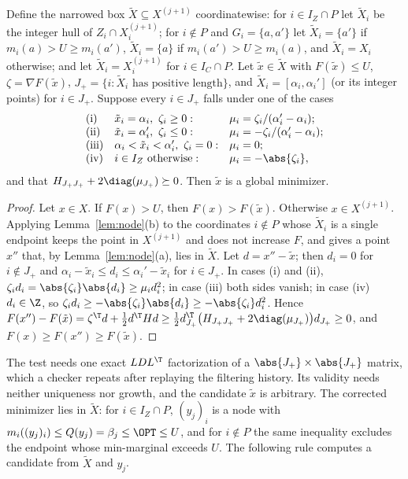 \begin{proposition}\label{prop:local}
Define the narrowed box $\tilde X\subseteq X^{(j+1)}$ coordinatewise: for
$i\in I_Z\cap P$ let $\tilde X_i$ be the integer hull of
$Z_i\cap X^{(j+1)}_i$; for $i\notin P$ and $G_i=\{a,a'\}$ let
$\tilde X_i=\{a'\}$ if $m_i(a)>U\ge m_i(a')$, $\tilde X_i=\{a\}$ if
$m_i(a')>U\ge m_i(a)$, and $\tilde X_i=X_i$ otherwise; and let
$\tilde X_i=X^{(j+1)}_i$ for $i\in I_C\cap P$. Let $\tilde x\in\tilde X$
with $F(\tilde x)\le U$, $\zeta=\nabla F(\tilde x)$,
$J_+=\{i:\tilde X_i\text{ has positive length}\}$, and
$\tilde X_i=[\alpha_i,\alpha_i']$ (or its integer points) for $i\in J_+$.
Suppose every $i\in J_+$ falls under one of the cases
\[
\begin{array}{lll}
\text{(i)}&\tilde x_i=\alpha_i,\ \zeta_i\ge0:&\mu_i=\zeta_i/(\alpha_i'-\alpha_i);\\
\text{(ii)}&\tilde x_i=\alpha_i',\ \zeta_i\le0:&\mu_i=-\zeta_i/(\alpha_i'-\alpha_i);\\
\text{(iii)}&\alpha_i<\tilde x_i<\alpha_i',\ \zeta_i=0:&\mu_i=0;\\
\text{(iv)}&i\in I_Z\text{ otherwise}:&\mu_i=-\abs{\zeta_i},
\end{array}
\]
and that $H_{J_+J_+}+2\diag(\mu_{J_+})\succeq0$. Then $\tilde x$ is a global
minimizer.
\end{proposition}

\begin{proof}
Let $x\in X$. If $F(x)>U$, then $F(x)>F(\tilde x)$. Otherwise
$x\in X^{(j+1)}$. Applying Lemma~\ref{lem:node}(b) to the coordinates
$i\notin P$ whose $\tilde X_i$ is a single endpoint keeps the point in
$X^{(j+1)}$ and does not increase $F$, and gives a point $x''$ that, by
Lemma~\ref{lem:node}(a), lies in $\tilde X$. Let $d=x''-\tilde x$; then
$d_i=0$ for $i\notin J_+$ and $\alpha_i-\tilde x_i\le d_i\le\alpha_i'-\tilde x_i$
for $i\in J_+$. In cases (i) and (ii),
$\zeta_id_i=\abs{\zeta_i}\abs{d_i}\ge\mu_id_i^2$; in case (iii) both sides
vanish; in case (iv) $d_i\in\Z$, so
$\zeta_id_i\ge-\abs{\zeta_i}\abs{d_i}\ge-\abs{\zeta_i}d_i^2$. Hence
$F(x'')-F(\tilde x)=\zeta^\T d+\frac12d^\T Hd\ge\frac12d_{J_+}^\T\bigl(H_{J_+J_+}
+2\diag(\mu_{J_+})\bigr)d_{J_+}\ge0$, and $F(x)\ge F(x'')\ge F(\tilde x)$.
\end{proof}

The test needs one exact $LDL^\T$ factorization of a
$\abs{J_+}\times\abs{J_+}$ matrix, which a checker repeats after replaying the
filtering history. Its validity needs neither uniqueness nor growth, and the
candidate $\tilde x$ is arbitrary. The corrected minimizer lies in
$\tilde X$: for $i\in I_Z\cap P$, $(y_j)_i$ is a node with
$m_i((y_j)_i)\le Q(y_j)=\beta_j\le\OPT\le U$, and for $i\notin P$ the same
inequality excludes the endpoint whose min-marginal exceeds $U$. The
following rule computes a candidate from $\tilde X$ and $y_j$.

